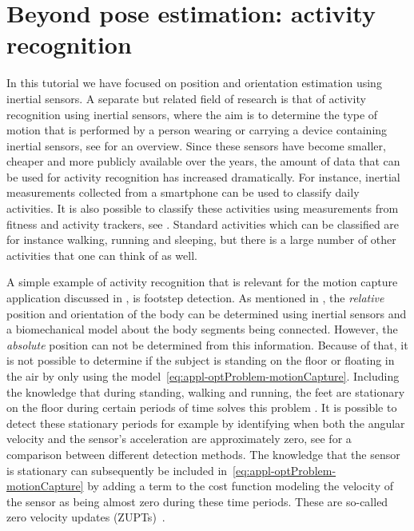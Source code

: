 \section{Beyond pose estimation: activity recognition}
\label{sec:appl-actRecogn}
In this tutorial we have focused on position and orientation estimation using inertial sensors. A separate but related field of research is that of activity recognition using inertial sensors, where the aim is to determine the type of motion that is performed by a person wearing or carrying a device containing inertial sensors, see \cite{bullingBS:2014,avciBMMH:2010} for an overview. Since these sensors have become smaller, cheaper and more publicly available over the years, the amount of data that can be used for activity recognition has increased dramatically. For instance, inertial measurements collected from a smartphone can be used to classify daily activities. It is also possible to classify these activities using measurements from fitness and activity trackers, see \eg \cite{fitbit:2017,garmin:2017,polar:2017}. Standard activities which can be classified are for instance walking, running and sleeping, but there is a large number of other activities that one can think of as well. 

A simple example of activity recognition that is relevant for the motion capture application discussed in , is footstep detection. As mentioned in , the \emph{relative} position and orientation of the body can be determined using inertial sensors and a biomechanical model about the body segments being connected. However, the \emph{absolute} position can not be determined from this information. Because of that, it is not possible to determine if the subject is standing on the floor or floating in the air by only using the model~\eqref{eq:appl-optProblem-motionCapture}. Including the knowledge that during standing, walking and running, the feet are stationary on the floor during certain periods of time solves this problem \cite{foxlin:2005,colomarNH:2012}. It is possible to detect these stationary periods for example by identifying when both the angular velocity and the sensor's acceleration are approximately zero, see \cite{skogHNR:2010} for a comparison between different detection methods. The knowledge that the sensor is stationary can subsequently be included in~\eqref{eq:appl-optProblem-motionCapture} by adding a term to the cost function modeling the velocity of the sensor as being almost zero during these time periods. These are so-called zero velocity updates (ZUPTs)~\cite{foxlin:2005,colomarNH:2012}. 

